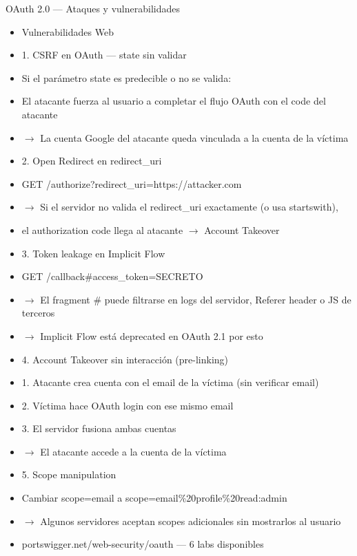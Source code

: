 \documentclass[aspectratio=169,10pt]{beamer}
\begin{document}
\begin{frame}[allowframebreaks]{OAuth 2.0 --- Ataques y vulnerabilidades}
\small
  \begin{itemize}
  \item Vulnerabilidades Web
  \item 1. CSRF en OAuth --- state sin validar
  \item Si el parámetro state es predecible o no se valida:
  \item El atacante fuerza al usuario a completar el flujo OAuth con el code del atacante
  \item $\rightarrow$ La cuenta Google del atacante queda vinculada a la cuenta de la víctima
  \item 2. Open Redirect en redirect\_uri
  \item GET /authorize?redirect\_uri=https://attacker.com
  \item $\rightarrow$ Si el servidor no valida el redirect\_uri exactamente (o usa startswith),
  \item el authorization code llega al atacante $\rightarrow$ Account Takeover
  \item 3. Token leakage en Implicit Flow
  \item GET /callback\#access\_token=SECRETO
  \item $\rightarrow$ El fragment \# puede filtrarse en logs del servidor, Referer header o JS de terceros
  \item $\rightarrow$ Implicit Flow está deprecated en OAuth 2.1 por esto
  \item 4. Account Takeover sin interacción (pre-linking)
  \item 1. Atacante crea cuenta con el email de la víctima (sin verificar email)
  \item 2. Víctima hace OAuth login con ese mismo email
  \item 3. El servidor fusiona ambas cuentas
  \item $\rightarrow$ El atacante accede a la cuenta de la víctima
  \item 5. Scope manipulation
  \item Cambiar scope=email a scope=email\%20profile\%20read:admin
  \item $\rightarrow$ Algunos servidores aceptan scopes adicionales sin mostrarlos al usuario
  \item portswigger.net/web-security/oauth --- 6 labs disponibles
  \end{itemize}
\end{frame}
\end{document}
